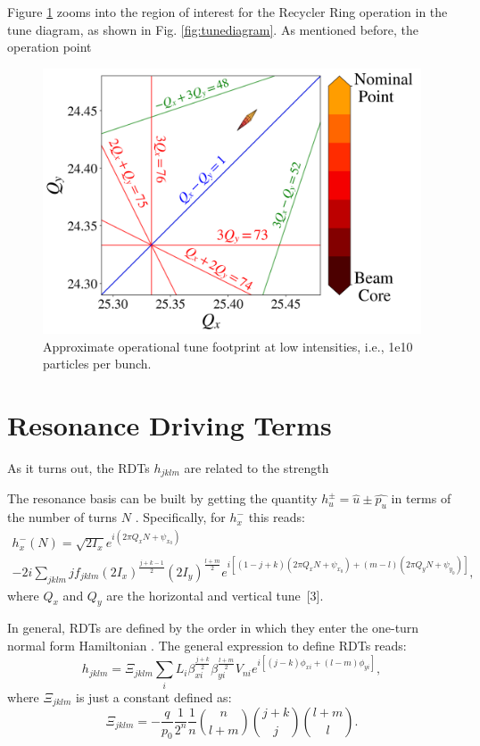 Figure \ref{fig:rrtdlow} zooms into the region of interest for the Recycler Ring operation in the tune diagram, as shown in Fig. \ref{fig:tunediagram}. As mentioned before, the operation point   

 \begin{figure}[H]
    \centering
    \includegraphics[width=\columnwidth]{chapter2/rrtdlow.png}
    \caption{Approximate operational tune footprint at low intensities, i.e., 1e10 particles per bunch.}
    \label{fig:rrtdlow}
 \end{figure}

\section{\label{sec:rdts}Resonance Driving Terms} 

As it turns out, the RDTs $h_{jklm}$ are related to the strength 

The resonance basis can be built by getting the quantity $h_u^{\pm}=\hat{u}\pm \hat{p_u}$ in terms of the number of turns $N$ . Specifically, for $h_x^{-}$ this reads:
\begin{multline}
    \label{eq:hx-}
    h_x^{-}(N)=\sqrt{2I_x}e^{i\left( 2\pi Q_x N +\psi_{x_0}\right)} \\
    -2i \sum_{jklm} j f_{jklm} \left( 2I_x \right)^{\frac{j+k-1}{2}}\left( 2I_y \right)^{\frac{l+m}{2}}
    e^{i \left[ \left( 1-j+k\right)\left( 2\pi Q_x N + \psi_{x_0} \right) +\left( m-l\right)\left( 2\pi Q_y N + \psi_{y_0} \right)\right]},
\end{multline}
where $Q_x$ and $Q_y$ are the horizontal and vertical tune~[3]. 

In general, RDTs are defined by the order in which they enter the one-turn normal form Hamiltonian \cite{bartolini}. The general expression to define RDTs reads:
\begin{equation}
    \label{eq:rdt1}
    h_{jklm}=\Xi _{jklm} \sum_i L_i \beta_{xi}^{\frac{j+k}{2}} \beta_{yi}^{\frac{l+m}{2}} V_{ni}e^{i\left[ (j-k)\phi_{xi} +(l-m) \phi_{yi} \right]},
\end{equation}
where $\Xi _{jklm}$ is just a constant defined as:
\begin{equation}
    \label{eq:rdt2}
    \Xi _{jklm} = -\frac{q}{p_0}\frac{1}{2^n}\frac{1}{n} {\binom{n}{l+m}} {\binom{j+k}{j}}{\binom{l+m}{l}}.
\end{equation}

